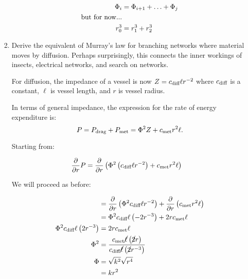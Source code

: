 \begin{enumerate}
       \begin{align*}
       \Phi_i  &=\Phi_{i+1} + \hdots + \Phi_j
       \\
       \textnormal{but for now...}
       \\
       r_0^3   &= r_1^3 + r_2^3
       \end{align*}
       \solutionend
    
    
    \item
      Derive the equivalent of Murray's law for branching
      networks where material moves by diffusion.
      Perhaps surprisingly, this connects
      the inner workings of insects,
      electrical networks, and search on networks.
    
      For diffusion,
      the impedance of a vessel is now
      $
      Z
      =
      c_{\textnormal{diff}}
      \ell
      r^{-2}
      $
      where
      $c_{\textnormal{diff}}$ is a constant,
      $\ell$ is vessel length,
      and $r$ is vessel radius.
    
      In terms of general impedance, the expression
      for the rate of energy expenditure is:
      $$
      P
      =
      P_{\textnormal{drag}} + P_{\textnormal{met}}
      =
      \Phi^{2}
      Z
      +
      c_{\textnormal{met}}
      r^{2} \ell.
      $$

  
   \solutionstart

   Starting from:

   \begin{align*}
   \frac{\partial }{\partial r} P
   &= 
   \frac{\partial }{\partial r} 
   \left( 
   \Phi^{2}
   \left(
   c_{\textnormal{diff}}
   \ell
   r^{-2}
   \right)
   +
   c_{\textnormal{met}}
   r^{2}
   \ell
   \right)
   \end{align*}
   
   We will proceed as before:
   
   \begin{align*}
   &= 
   \frac{\partial }{\partial r}
   \left(
   \Phi^{2}
   c_{\textnormal{diff}}
   \ell
   r^{-2}
   \right)
   +
   \frac{\partial }{\partial r}
   \left( 
   c_{\textnormal{met}}
   r^{2}
   \ell
   \right)
   \\
   &=
   \Phi^{2}
   c_{\textnormal{diff}}
   \ell
   \left(
   -2 
   r^{-3}
   \right)
   +
   2
   r
   c_{\textnormal{met}}
   \ell
   \\
   \Phi^{2}
   c_{\textnormal{diff}}
   \ell
   \left(
   2 
   r^{-3}
   \right)
   &=
   2
   r
   c_{\textnormal{met}}
   \ell
   \\
   \Phi^2
   &=
   \frac{
        c_{\textnormal{met}}
        \cancel{\ell}
        \left(
        \cancel{2}r
        \right)
   }{
        c_{\textnormal{diff}}
   \cancel{\ell}
   \left(
   \cancel{2} 
   r^{-3}
   \right)}
   \\
   \Phi
   &=
   \sqrt{k^2}
   \sqrt{r^4}\\
   &= kr^2
   \end{align*}
   

\end{enumerate}
